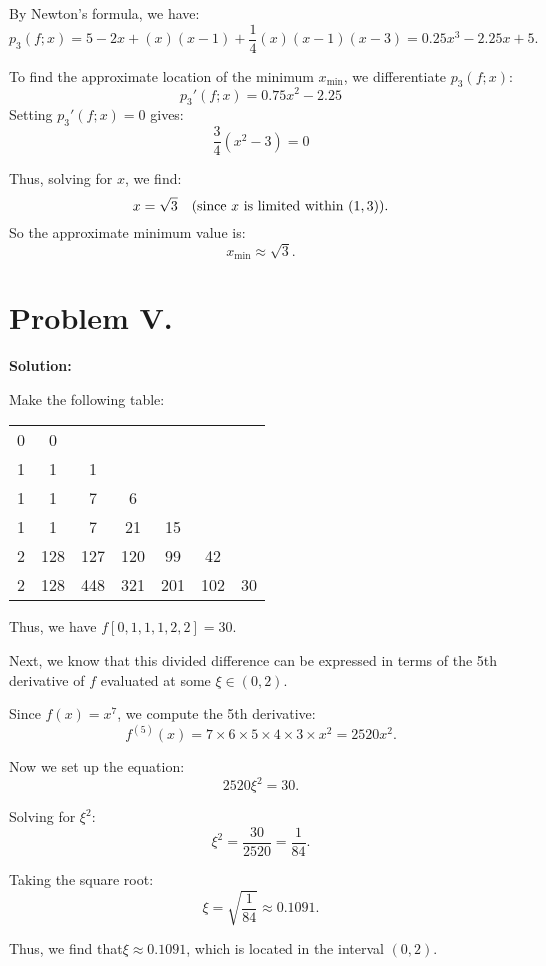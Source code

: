\documentclass[a4paper]{article}
\begin{document}
By Newton's formula, we have:
\[
p_3(f; x) = 5 - 2x + (x)(x-1) + \frac{1}{4}(x)(x-1)(x-3) = \boxed{0.25x^3 - 2.25x + 5}.
\]

To find the approximate location of the minimum \( x_{\min} \), we differentiate \( p_3(f; x) \):
\[
p_3'(f; x) = 0.75x^2 - 2.25
\]
Setting \( p_3'(f; x) = 0 \) gives:
\[
\frac{3}{4} (x^2 - 3) = 0
\]

Thus, solving for \( x \), we find:
\[
x = \sqrt{3} \quad \text{(since \( x \) is limited within \( (1, 3) \))}.
\]
So the approximate minimum value is:
\[
\boxed{x_{\min} \approx \sqrt{3}}.
\]

\section*{Problem V.}

\textbf{Solution:}

Make the following table:

\begin{table}[htbp]
    \centering
    \begin{tabular}{c|cccccc}
        0 & 0 &  &  &  &  &  \\ 
        1 & 1 & 1 &  &  &  &  \\ 
        1 & 1 & 7 & 6 &  &  &  \\ 
        1 & 1 & 7 & 21 & 15 &  &  \\ 
        2 & 128 & 127 & 120 & 99 & 42 & \\ 
        2 & 128 & 448 & 321 & 201 & 102 & 30 \\ 
    \end{tabular}
\end{table}

Thus, we have \( \boxed{f[0, 1, 1, 1, 2, 2] = 30} \).

Next, we know that this divided difference can be expressed in terms of the 5th derivative of \( f \) evaluated at some \( \xi \in (0, 2) \). 

Since \( f(x) = x^7 \), we compute the 5th derivative:
\[
f^{(5)}(x) = 7 \times 6 \times 5 \times 4 \times 3 \times x^2 = 2520x^2.
\]

Now we set up the equation:
\[
2520\xi^2 = 30.
\]

Solving for \( \xi^2 \):
\[
\xi^2 = \frac{30}{2520} = \frac{1}{84}.
\]

Taking the square root:
\[
\xi = \sqrt{\frac{1}{84}} \approx 0.1091.
\]

Thus, we find that\(\boxed{\xi \approx 0.1091}\), which is located in the interval \( (0, 2) \).
\end{document}
